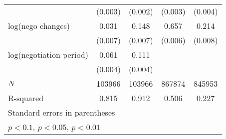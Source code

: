 {\begin{tabular}{l*{4}{c}}
            &     (0.003)         &     (0.002)         &     (0.003)         &     (0.004)         \\
\addlinespace
log(nego changes)&       0.031\sym{***}&       0.148\sym{***}&       0.657\sym{***}&       0.214\sym{***}\\
            &     (0.007)         &     (0.007)         &     (0.006)         &     (0.008)         \\
\addlinespace
log(negotiation period)&       0.061\sym{***}&       0.111\sym{***}&                     &                     \\
            &     (0.004)         &     (0.004)         &                     &                     \\
\midrule
\(N\)       &      103966         &      103966         &      867874         &      845953         \\
R-squared   &       0.815         &       0.912         &       0.506         &       0.227         \\
\bottomrule
\multicolumn{5}{l}{\footnotesize Standard errors in parentheses}\\
\multicolumn{5}{l}{\footnotesize \sym{*} \(p<0.1\), \sym{**} \(p<0.05\), \sym{***} \(p<0.01\)}\\
\end{tabular}
}
